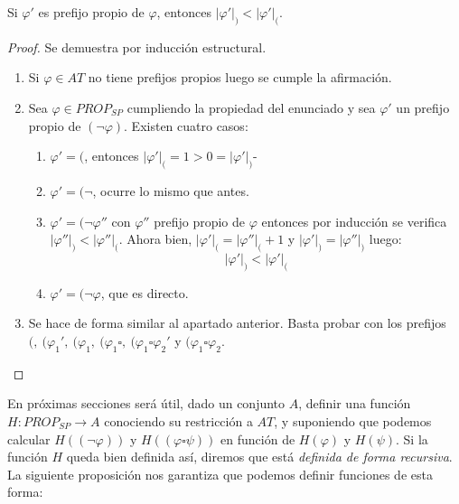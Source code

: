 \begin{prop} Si $\varphi'$ es prefijo propio de $\varphi$, entonces $|\varphi'|_) < |\varphi'|_($.
\begin{proof} Se demuestra por inducción estructural.
\begin{enumerate}
    \item Si $\varphi\in AT$ no tiene prefijos propios luego se cumple la afirmación.
    \item Sea $\varphi\in PROP_{SP}$ cumpliendo la propiedad del enunciado y sea $\varphi'$ un prefijo propio de $(\neg \varphi)$. Existen cuatro casos:
    \begin{enumerate}
        \item $\varphi' = ($, entonces $|\varphi'|_( = 1 > 0 = |\varphi'|_)$-
        \item $\varphi' = (\neg$, ocurre lo mismo que antes.
        \item $\varphi' = (\neg \varphi''$ con $\varphi''$ prefijo propio de $\varphi$ entonces por inducción se verifica $|\varphi''|_) < |\varphi''|_($. Ahora bien, $|\varphi'|_( = |\varphi''|_(+1$  y $|\varphi'|_) = |\varphi''|_)$ luego:
        \[
            |\varphi'|_) < |\varphi'|_(
        \]
        \item $\varphi' = (\neg \varphi$, que es directo. 
    \end{enumerate}
    \item Se hace de forma similar al apartado anterior. Basta probar con los prefijos $(,\ (\varphi_1',\ (\varphi_1,\ (\varphi_1\square,\ (\varphi_1\square\varphi_2'$ y $(\varphi_1\square\varphi_2$.
\end{enumerate}
    
\end{proof}
\end{prop}

 En próximas secciones será útil, dado un conjunto $A$, definir una función $H: PROP_{SP} \rightarrow A$ conociendo su restricción a $AT$, y suponiendo que podemos calcular $H((\neg \varphi))$ y $H((\varphi\square\psi))$ en función de $H(\varphi)$ y $H(\psi)$.
 Si la función $H$ queda bien definida así, diremos que está \textit{definida de forma recursiva}. La siguiente proposición nos garantiza que podemos definir funciones de esta forma:
 
